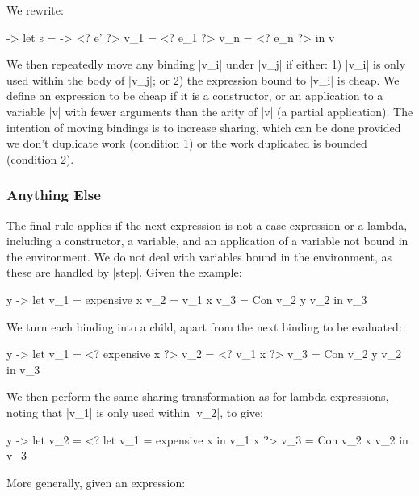 \documentclass[draft]{sigplanconf}
\begin{document}
We rewrite:

\begin{code}
\free ->  let  s    = \x -> <? e' ?>
               v_1  = <? e_1 ?>
               v_n  = <? e_n ?>
          in   v
\end{code}

We then repeatedly move any binding |v_i| under |v_j| if either: 1) |v_i| is only used within the body of |v_j|; or 2) the expression bound to |v_i| is cheap. We define an expression to be cheap if it is a constructor, or an application to a variable |v| with fewer arguments than the arity of |v| (a partial application). The intention of moving bindings is to increase sharing, which can be done provided we don't duplicate work (condition 1) or the work duplicated is bounded (condition 2).

\subsubsection{Anything Else}
\label{sec:eval_split_other}

The final rule applies if the next expression is not a case expression or a lambda, including a constructor, a variable, and an application of a variable not bound in the environment. We do not deal with variables bound in the environment, as these are handled by |step|. Given the example:

\begin{code}
\x y ->  let  v_1 = expensive x
              v_2 = v_1 x
              v_3 = Con v_2 y v_2
         in   v_3
\end{code}

\noindent We turn each binding into a child, apart from the next binding to be evaluated:

\begin{code}
\x y ->  let  v_1 = <? expensive x ?>
              v_2 = <? v_1 x ?>
              v_3 = Con v_2 y v_2
         in   v_3
\end{code}

\noindent We then perform the same sharing transformation as for lambda expressions, noting that |v_1| is only used within |v_2|, to give:

\begin{code}
\x y ->  let  v_2 = <? let v_1 = expensive x in v_1 x ?>
              v_3 = Con v_2 x v_2
         in   v_3
\end{code}

More generally, given an expression:
\end{document}
